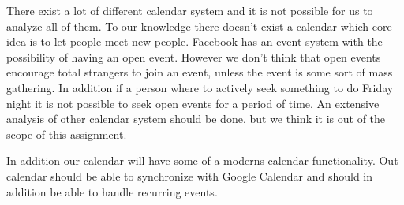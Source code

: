 There exist a lot of different calendar system and it is not possible for us to analyze all of them.
To our knowledge there doesn't exist a calendar which core idea is to let people meet new people. 
Facebook has an event system with the possibility of having an open event. However we don't think that open events encourage total strangers to join an event, unless the event is some sort of mass gathering. 
In addition if a person where to actively seek something to do Friday night it is not possible to seek open events for a period of time. 
An extensive analysis of other calendar system should be done, but we think it is out of the scope of this assignment.

In addition our calendar will have some of a moderns calendar functionality. Out calendar should be able to synchronize with Google Calendar and should in addition be able to handle recurring events. 